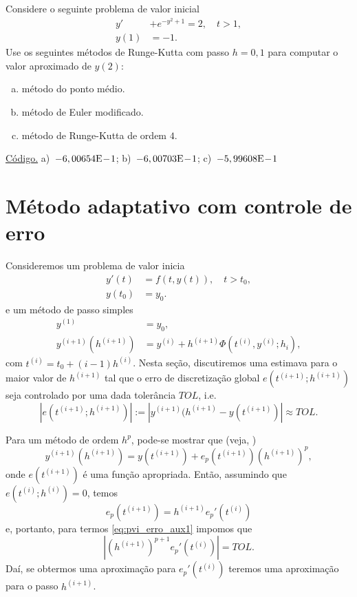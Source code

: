 \begin{exer}
  Considere o seguinte problema de valor inicial
  \begin{align}
    y' &+ e^{-y^2+1} = 2,\quad t>1,\\
    y(1) &= -1.
  \end{align}
Use os seguintes métodos de Runge-Kutta com passo $h=0,1$ para computar o valor aproximado de $y(2)$:
\begin{enumerate}[a)]
\item método do ponto médio.
\item método de Euler modificado.
\item método de Runge-Kutta de ordem $4$.
\end{enumerate}
\end{exer}
\begin{resp}
  \ifisoctave 
  \href{https://github.com/phkonzen/notas/blob/master/src/MatematicaNumerica/cap_integr/dados/exer_RK_pvi1/exer_RK_pvi1.m}{Código.} 
  \fi
  a)~$-6,00654\mathrm{E}\!-\!1$; b)~$-6,00703\mathrm{E}\!-\!1$; c)~$-5,99608\mathrm{E}\!-\!1$
\end{resp}

\section{Método adaptativo com controle de erro}\label{cap_pvi_met_adap}

Consideremos um problema de valor inicia
\begin{align}
  y'(t) &= f(t,y(t)),\quad t>t_0,\\
  y(t_0) &= y_0.
\end{align}
e um método de passo simples
\begin{align}
  y^{(1)} &= y_0,\\
  y^{(i+1)}(h^{(i+1)}) &= y^{(i)} + h^{(i+1)}\Phi(t^{(i)},y^{(i)};h_i),
\end{align}
com $t^{(i)} = t_0 + (i-1)h^{(i)}$. Nesta seção, discutiremos uma estimava para o maior valor de $h^{(i+1)}$ tal que o erro de discretização global $e(t^{(i+1)};h^{(i+1)})$ seja controlado por uma dada tolerância $TOL$, i.e.
\begin{equation}\label{eq:pvi_erro_aux1}
  |e(t^{(i+1)};h^{(i+1)})| := |y^{(i+1)}(h^{(i+1)} - y(t^{(i+1)})| \approx TOL.
\end{equation}

Para um método de ordem $h^p$, pode-se mostrar que (veja, \cite[Cap. 7, Seç. 7.2]{Isaacson1994a})
\begin{equation}\label{eq:pvi_erro_aux0}
  y^{(i+1)}(h^{(i+1)}) = y(t^{(i+1)}) + e_p(t^{(i+1)})(h^{(i+1)})^p,
\end{equation}
onde $e(t^{(i+1)})$ é uma função apropriada. Então, assumindo que $e(t^{(i)};h^{(i)})=0$, temos
\begin{equation}\label{eq:pvi_erro_aux2}
  e_p(t^{(i+1)}) = h^{(i+1)}e_p'(t^{(i)})
\end{equation}
e, portanto, para termos \eqref{eq:pvi_erro_aux1} impomos que
\begin{equation}\label{eq:pvi_erro_aux4}
  |(h^{(i+1)})^{p+1}e_p'(t^{(i)})| = TOL.
\end{equation}
Daí, se obtermos uma aproximação para $e_p'(t^{(i)})$ teremos uma aproximação para o passo $h^{(i+1)}$.

